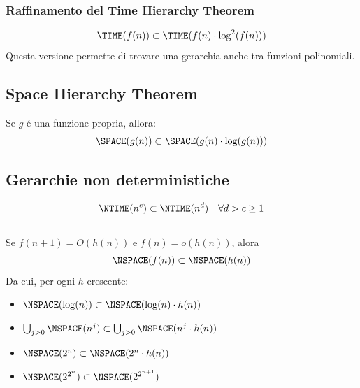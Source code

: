 \subsubsection{Raffinamento del Time Hierarchy Theorem}
\[\TIME(f(n)) \subset \TIME(f(n) \cdot \log^2(f(n)))\]
Questa versione permette di trovare una gerarchia anche tra funzioni polinomiali.

\subsection{Space Hierarchy Theorem}
Se $g$ é una funzione propria, allora:
\[\SPACE(g(n)) \subset \SPACE(g(n) \cdot \log(g(n)))\]


\subsection{Gerarchie non deterministiche}
\[\NTIME(n^c) \subset \NTIME(n^d) \quad \forall d > c \geq 1\] \\

Se $f(n+1) = O(h(n))$ e $f(n) = o(h(n))$, alora \\
\[\NSPACE(f(n)) \subset \NSPACE(h(n))\]
Da cui, per ogni $h$ crescente:
\begin{itemize}
    \item $\NSPACE(\log(n)) \subset \NSPACE(\log(n) \cdot h(n))$
    \item $\bigcup_{j>0} \NSPACE(n^j) \subset \bigcup_{j>0} \NSPACE(n^j \cdot h(n))$
    \item $\NSPACE(2^n) \subset \NSPACE(2^n \cdot h(n))$
    \item $\NSPACE(2^{2^n}) \subset \NSPACE(2^{2^{n+1}})$
\end{itemize}